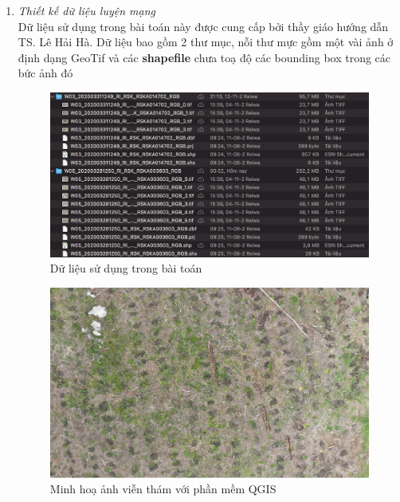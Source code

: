 \documentclass[a4paper, 12pt]{report}
\begin{document}
\begin{enumerate}[label= \textit{\alph*)}]
\item \textit{Thiết kế dữ liệu luyện mạng} \\
Dữ liệu sử dụng trong bài toán này được cung cấp bởi thầy giáo hướng dẫn TS.  Lê Hải Hà.  Dữ liệu bao gồm 2 thư mục,  nỗi thư mực gồm một vài ảnh ở định dạng GeoTif và các \textbf{shapefile} chưa toạ độ các bounding box trong các bức ảnh đó
 \begin{figure}[!htb]
	\centering
	\includegraphics[width=1\linewidth]{Images/data_folder}
	\caption{Dữ liệu sử dụng trong bài toán}
	\label{fig:data_folder}
\end{figure}

\newpage
 \begin{figure}[!htb]
	\centering
	\includegraphics[width=1\linewidth]{Images/qgisa}
	\caption{Minh hoạ ảnh viễn thám với phần mềm QGIS} 
	\label{fig:1a}
\end{figure}



\end{enumerate}
\end{document}
